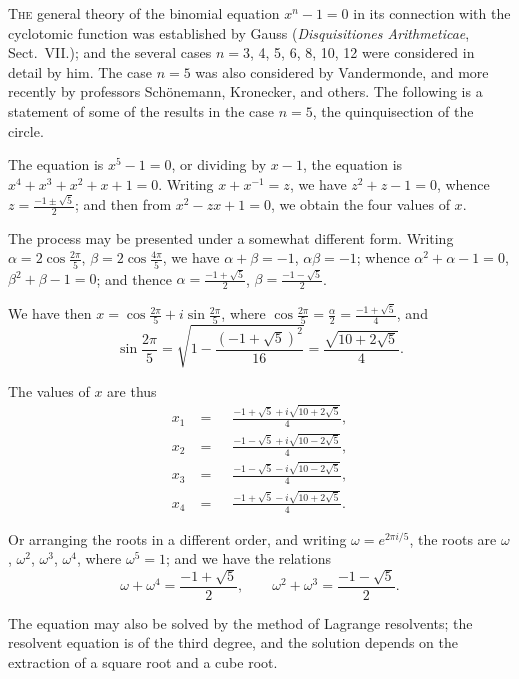 \documentclass[11pt,a4paper]{article}
\theoremstyle{plain}
\theoremstyle{definition}
\theoremstyle{remark}
\begin{document}
\bigskip

\noindent
\textsc{The} general theory of the binomial equation $x^n - 1 = 0$ in its connection with the cyclotomic function was established by Gauss (\textit{Disquisitiones Arithmeticae}, Sect.~VII.); and the several cases $n = 3$, 4, 5, 6, 8, 10, 12 were considered in detail by him. The case $n = 5$ was also considered by Vandermonde, and more recently by professors Sch\"{o}nemann, Kronecker, and others. The following is a statement of some of the results in the case $n = 5$, the quinquisection of the circle.

The equation is $x^5 - 1 = 0$, or dividing by $x - 1$, the equation is $x^4 + x^3 + x^2 + x + 1 = 0$. Writing $x + x^{-1} = z$, we have $z^2 + z - 1 = 0$, whence $z = \frac{-1 \pm \sqrt{5}}{2}$; and then from $x^2 - zx + 1 = 0$, we obtain the four values of $x$.

The process may be presented under a somewhat different form. Writing $\alpha = 2\cos\frac{2\pi}{5}$, $\beta = 2\cos\frac{4\pi}{5}$, we have $\alpha + \beta = -1$, $\alpha\beta = -1$; whence $\alpha^2 + \alpha - 1 = 0$, $\beta^2 + \beta - 1 = 0$; and thence $\alpha = \frac{-1 + \sqrt{5}}{2}$, $\beta = \frac{-1 - \sqrt{5}}{2}$.

We have then $x = \cos\frac{2\pi}{5} + i\sin\frac{2\pi}{5}$, where $\cos\frac{2\pi}{5} = \frac{\alpha}{2} = \frac{-1 + \sqrt{5}}{4}$, and
\[
\sin\frac{2\pi}{5} = \sqrt{1 - \frac{(-1+\sqrt{5})^2}{16}} = \frac{\sqrt{10 + 2\sqrt{5}}}{4}.
\]

The values of $x$ are thus
\begin{align*}
x_1 &= \phantom{-}\frac{-1 + \sqrt{5} + i\sqrt{10 + 2\sqrt{5}}}{4},\\
x_2 &= \phantom{-}\frac{-1 - \sqrt{5} + i\sqrt{10 - 2\sqrt{5}}}{4},\\
x_3 &= \phantom{-}\frac{-1 - \sqrt{5} - i\sqrt{10 - 2\sqrt{5}}}{4},\\
x_4 &= \phantom{-}\frac{-1 + \sqrt{5} - i\sqrt{10 + 2\sqrt{5}}}{4}.
\end{align*}

Or arranging the roots in a different order, and writing $\omega = e^{2\pi i/5}$, the roots are $\omega$, $\omega^2$, $\omega^3$, $\omega^4$, where $\omega^5 = 1$; and we have the relations
\[
\omega + \omega^4 = \frac{-1 + \sqrt{5}}{2},\qquad \omega^2 + \omega^3 = \frac{-1 - \sqrt{5}}{2}.
\]

The equation may also be solved by the method of Lagrange resolvents; the resolvent equation is of the third degree, and the solution depends on the extraction of a square root and a cube root.
\end{document}
